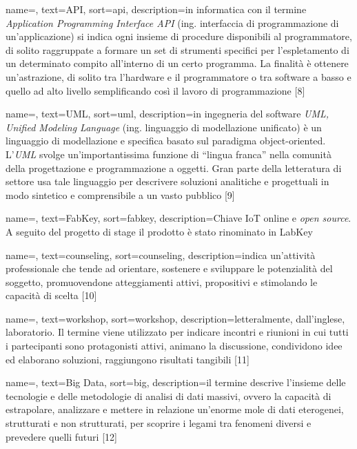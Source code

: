 \renewcommand{\glossaryname}{Glossario}

{
    name=,
    text=API,
    sort=api,
    description={in informatica con il termine \emph{Application Programming Interface API} (ing. interfaccia di programmazione di un'applicazione) si indica ogni insieme di procedure disponibili al programmatore, di solito raggruppate a formare un set di strumenti specifici per l'espletamento di un determinato compito all'interno di un certo programma. La finalità è ottenere un'astrazione, di solito tra l'hardware e il programmatore o tra software a basso e quello ad alto livello semplificando così il lavoro di programmazione [8]}
}

{
    name=,
    text=UML,
    sort=uml,
    description={in ingegneria del software \emph{UML, Unified Modeling Language} (ing. linguaggio di modellazione unificato) è un linguaggio di modellazione e specifica basato sul paradigma object-oriented. L'\emph{UML} svolge un'importantissima funzione di ``lingua franca'' nella comunità della progettazione e programmazione a oggetti. Gran parte della letteratura di settore usa tale linguaggio per descrivere soluzioni analitiche e progettuali in modo sintetico e comprensibile a un vasto pubblico [9]}
}

{
    name=,
    text=FabKey,
    sort=fabkey,
    description={Chiave IoT online e \textit{open source}. A seguito del progetto di stage il prodotto è stato rinominato in LabKey}
}

{
	name=,
    text=counseling,
    sort=counseling,
    description={indica un'attività professionale che tende ad orientare, sostenere e sviluppare le potenzialità del soggetto, promuovendone atteggiamenti attivi, propositivi e stimolando le capacità di scelta [10]}
}

{
	name=,
    text=workshop,
    sort=workshop,
    description={letteralmente, dall'inglese, laboratorio. Il termine viene utilizzato per indicare incontri e riunioni in cui tutti i partecipanti sono protagonisti attivi, animano la discussione, condividono idee ed elaborano soluzioni, raggiungono risultati tangibili [11]}
}

{
	name=,
    text=Big Data,
    sort=big,
    description={il termine descrive l'insieme delle tecnologie e delle metodologie di analisi di dati massivi, ovvero la capacità di estrapolare, analizzare e mettere in relazione un'enorme mole di dati eterogenei, strutturati e non strutturati, per scoprire i legami tra fenomeni diversi e prevedere quelli futuri [12]}
}

